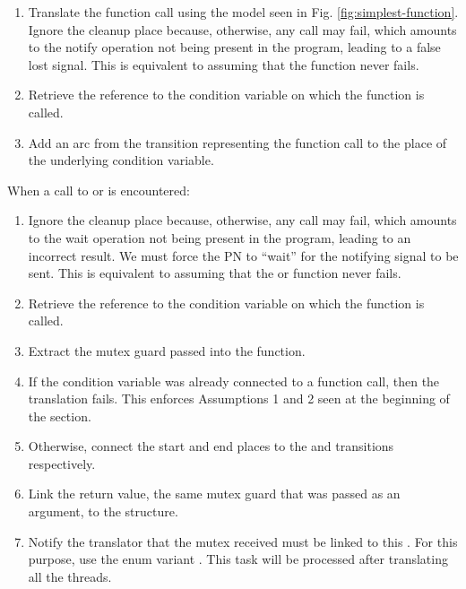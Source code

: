\begin{enumerate}
      \item Translate the function call using the model seen in Fig. \ref{fig:simplest-function}.
            Ignore the cleanup place because, otherwise, any call may fail,
            which amounts to the notify operation not being present in the program,
            leading to a false lost signal.
            This is equivalent to assuming that the  function never fails.
      \item Retrieve the  reference to the condition variable
            on which the function is called.
      \item Add an arc from the transition representing the function call
            to the  place of the underlying condition variable.
\end{enumerate}

When a call to 
or  is encountered:

\begin{enumerate}
      \item Ignore the cleanup place because, otherwise, any call may fail,
            which amounts to the wait operation not being present in the program,
            leading to an incorrect result.
            We must force the \acrshort{PN}
            to ``wait'' for the notifying signal to be sent.
            This is equivalent to assuming that the 
            or  function never fails.
      \item Retrieve the  reference to the condition variable
            on which the function is called.
      \item Extract the mutex guard passed into the function.
      \item If the condition variable was already connected to a function call,
            then the translation fails.
            This enforces Assumptions 1 and 2 seen at the beginning of the section.
      \item Otherwise, connect the start and end places to the
             and  transitions respectively.
      \item Link the return value, the same mutex guard that was passed as an argument,
            to the  structure.
      \item Notify the translator that the mutex received must be linked to this .
            For this purpose, use the enum variant .
            This task will be processed after translating all the threads.
\end{enumerate}

